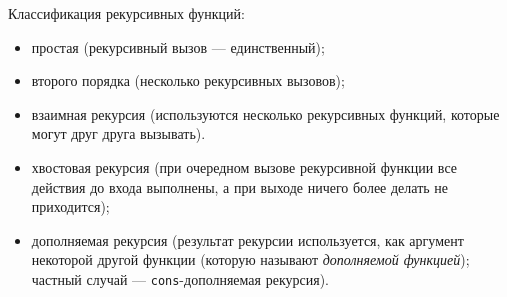 \documentclass[12pt]{report}
\begin{document}
Классификация рекурсивных функций:
\begin{itemize}
	\item простая (рекурсивный вызов --- единственный);
	\item второго порядка (несколько рекурсивных вызовов);
	\item взаимная рекурсия (используются несколько рекурсивных функций, которые могут друг друга вызывать).
	\item хвостовая рекурсия (при очередном вызове рекурсивной функции все действия до входа выполнены, а при выходе ничего более делать не приходится);
	\item дополняемая рекурсия (результат рекурсии используется, как аргумент некоторой другой функции (которую называют \textit{дополняемой функцией}); частный случай --- \texttt{cons}-дополняемая рекурсия).
\end{itemize}
	
	
	
	
\end{document}
